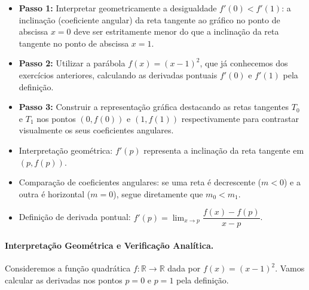 \begin{estrategiabox}[title=Estratégia Geral de Resolução]
  \begin{itemize}[noitemsep, topsep=2pt]
    \item \textbf{Passo 1:} Interpretar geometricamente a desigualdade $f'(0) < f'(1)$: a inclinação (coeficiente angular) da reta tangente ao gráfico no ponto de abscissa $x = 0$ deve ser estritamente menor do que a inclinação da reta tangente no ponto de abscissa $x = 1$.
    \item \textbf{Passo 2:} Utilizar a parábola $f(x) = (x - 1)^2$, que já conhecemos dos exercícios anteriores, calculando as derivadas pontuais $f'(0)$ e $f'(1)$ pela definição.
    \item \textbf{Passo 3:} Construir a representação gráfica destacando as retas tangentes $T_0$ e $T_1$ nos pontos $(0, f(0))$ e $(1, f(1))$ respectivamente para contrastar visualmente os seus coeficientes angulares.
  \end{itemize}
\end{estrategiabox}

\begin{recursosbox}[title=Ferramentas Algébricas e Geométricas]
  \begin{itemize}[noitemsep, topsep=2pt]
    \item Interpretação geométrica: $f'(p)$ representa a inclinação da reta tangente em $(p, f(p))$.
    \item Comparação de coeficientes angulares: se uma reta é decrescente ($m < 0$) e a outra é horizontal ($m = 0$), segue diretamente que $m_0 < m_1$.
    \item Definição de derivada pontual: $f'(p) = \lim_{x \to p} \dfrac{f(x) - f(p)}{x - p}$.
  \end{itemize}
\end{recursosbox}

\paragraph{Interpretação Geométrica e Verificação Analítica.}

Consideremos a função quadrática $f: \mathbb{R} \to \mathbb{R}$ dada por $f(x) = (x - 1)^2$.
Vamos calcular as derivadas nos pontos $p = 0$ e $p = 1$ pela definição.


